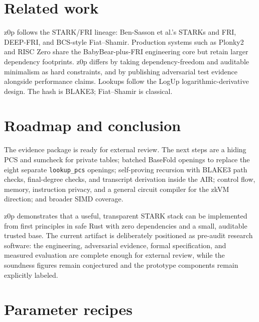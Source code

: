 \documentclass[11pt,a4paper]{article}
\begin{document}
\section{Related work}

z0p follows the STARK/FRI lineage: Ben-Sasson et al.'s STARKs and FRI,
DEEP-FRI, and BCS-style Fiat--Shamir. Production systems such as Plonky2 and
RISC Zero share the BabyBear-plus-FRI engineering core but retain larger
dependency footprints. z0p differs by taking dependency-freedom and
auditable minimalism as hard constraints, and by publishing adversarial test
evidence alongside performance claims. Lookups follow the LogUp
logarithmic-derivative design. The hash is BLAKE3; Fiat--Shamir is classical.

\section{Roadmap and conclusion}

The evidence package is ready for external review. The next steps are a
hiding PCS and sumcheck for private tables; batched BaseFold openings to
replace the eight separate \texttt{lookup\_pcs} openings; self-proving
recursion with BLAKE3 path checks, final-degree checks, and transcript
derivation inside the AIR; control flow, memory, instruction privacy, and a
general circuit compiler for the zkVM direction; and broader SIMD coverage.

z0p demonstrates that a useful, transparent STARK stack can be implemented
from first principles in safe Rust with zero dependencies and a small,
auditable trusted base. The current artifact is deliberately positioned as
pre-audit research software: the engineering, adversarial evidence, formal
specification, and measured evaluation are complete enough for external
review, while the soundness figures remain conjectured and the prototype
components remain explicitly labeled.

\appendix

\section{Parameter recipes}
\end{document}
